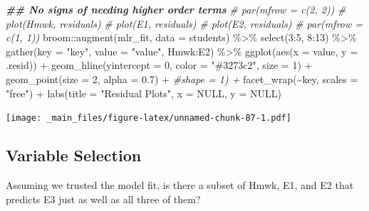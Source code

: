 \documentclass[
]{book}
\newenvironment{Shaded}{\begin{snugshade}}{\end{snugshade}}
\newcommand{\AttributeTok}[1]{\textcolor[rgb]{0.77,0.63,0.00}{#1}}
\newcommand{\CommentTok}[1]{\textcolor[rgb]{0.56,0.35,0.01}{\textit{#1}}}
\newcommand{\ConstantTok}[1]{\textcolor[rgb]{0.00,0.00,0.00}{#1}}
\newcommand{\DecValTok}[1]{\textcolor[rgb]{0.00,0.00,0.81}{#1}}
\newcommand{\DocumentationTok}[1]{\textcolor[rgb]{0.56,0.35,0.01}{\textbf{\textit{#1}}}}
\newcommand{\FloatTok}[1]{\textcolor[rgb]{0.00,0.00,0.81}{#1}}
\newcommand{\FunctionTok}[1]{\textcolor[rgb]{0.00,0.00,0.00}{#1}}
\newcommand{\NormalTok}[1]{#1}
\newcommand{\SpecialCharTok}[1]{\textcolor[rgb]{0.00,0.00,0.00}{#1}}
\newcommand{\StringTok}[1]{\textcolor[rgb]{0.31,0.60,0.02}{#1}}
\begin{document}
\begin{Shaded}
\begin{Highlighting}[]
\DocumentationTok{\#\# No signs of needing higher order terms}
\CommentTok{\# par(mfrow = c(2, 2))}
\CommentTok{\# plot(Hmwk, residuals)}
\CommentTok{\# plot(E1, residuals)}
\CommentTok{\# plot(E2, residuals)}
\CommentTok{\# par(mfrow = c(1, 1))}
\NormalTok{broom}\SpecialCharTok{::}\FunctionTok{augment}\NormalTok{(mlr\_fit, }\AttributeTok{data =}\NormalTok{ students) }\SpecialCharTok{\%\textgreater{}\%} 
  \FunctionTok{select}\NormalTok{(}\DecValTok{3}\SpecialCharTok{:}\DecValTok{5}\NormalTok{, }\DecValTok{8}\SpecialCharTok{:}\DecValTok{13}\NormalTok{) }\SpecialCharTok{\%\textgreater{}\%} 
  \FunctionTok{gather}\NormalTok{(}\AttributeTok{key =} \StringTok{"key"}\NormalTok{, }\AttributeTok{value =} \StringTok{"value"}\NormalTok{, Hmwk}\SpecialCharTok{:}\NormalTok{E2) }\SpecialCharTok{\%\textgreater{}\%} 
  \FunctionTok{ggplot}\NormalTok{(}\FunctionTok{aes}\NormalTok{(}\AttributeTok{x =}\NormalTok{ value, }\AttributeTok{y =}\NormalTok{ .resid)) }\SpecialCharTok{+} 
  \FunctionTok{geom\_hline}\NormalTok{(}\AttributeTok{yintercept =} \DecValTok{0}\NormalTok{, }\AttributeTok{color =} \StringTok{"\#3273c2"}\NormalTok{, }\AttributeTok{size =} \DecValTok{1}\NormalTok{) }\SpecialCharTok{+}
  \FunctionTok{geom\_point}\NormalTok{(}\AttributeTok{size =} \DecValTok{2}\NormalTok{, }\AttributeTok{alpha =} \FloatTok{0.7}\NormalTok{) }\SpecialCharTok{+} \CommentTok{\#shape = 1) +}
  \FunctionTok{facet\_wrap}\NormalTok{(}\SpecialCharTok{\textasciitilde{}}\NormalTok{key, }\AttributeTok{scales =} \StringTok{"free"}\NormalTok{) }\SpecialCharTok{+}
  \FunctionTok{labs}\NormalTok{(}\AttributeTok{title =} \StringTok{"Residual Plots"}\NormalTok{, }
       \AttributeTok{x =} \ConstantTok{NULL}\NormalTok{, }
       \AttributeTok{y =} \ConstantTok{NULL}\NormalTok{)}
\end{Highlighting}
\end{Shaded}

\texttt{[image: \_main\_files/figure-latex/unnamed-chunk-87-1.pdf]}

\hypertarget{variable-selection}{%
\subsection{Variable Selection}\label{variable-selection}}

Assuming we trusted the model fit, is there a subset of Hmwk, E1, and E2 that predicts E3 just as well as all three of them?
\end{document}
